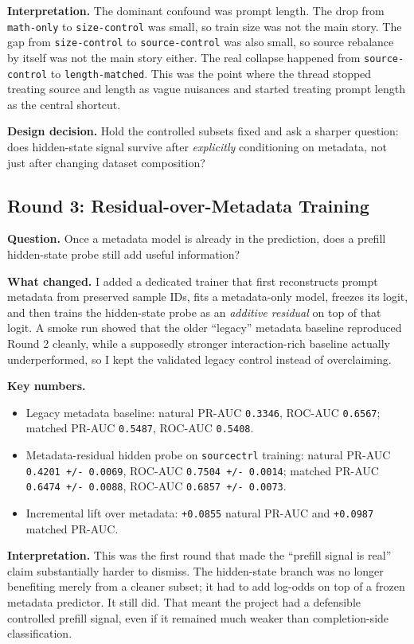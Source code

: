 \documentclass[11pt]{article}
\begin{document}
\textbf{Interpretation.} The dominant confound was prompt length. The drop from \texttt{math-only} to \texttt{size-control} was small, so train size was not the main story. The gap from \texttt{size-control} to \texttt{source-control} was also small, so source rebalance by itself was not the main story either. The real collapse happened from \texttt{source-control} to \texttt{length-matched}. This was the point where the thread stopped treating source and length as vague nuisances and started treating prompt length as the central shortcut.

\textbf{Design decision.} Hold the controlled subsets fixed and ask a sharper question: does hidden-state signal survive after \emph{explicitly} conditioning on metadata, not just after changing dataset composition?

\subsection*{Round 3: Residual-over-Metadata Training}
\textbf{Question.} Once a metadata model is already in the prediction, does a prefill hidden-state probe still add useful information?

\textbf{What changed.} I added a dedicated trainer that first reconstructs prompt metadata from preserved sample IDs, fits a metadata-only model, freezes its logit, and then trains the hidden-state probe as an \emph{additive residual} on top of that logit. A smoke run showed that the older ``legacy'' metadata baseline reproduced Round 2 cleanly, while a supposedly stronger interaction-rich baseline actually underperformed, so I kept the validated legacy control instead of overclaiming.

\textbf{Key numbers.}
\begin{itemize}
  \item Legacy metadata baseline:
    natural PR-AUC \texttt{0.3346}, ROC-AUC \texttt{0.6567};
    matched PR-AUC \texttt{0.5487}, ROC-AUC \texttt{0.5408}.
  \item Metadata-residual hidden probe on \texttt{sourcectrl} training:
    natural PR-AUC \texttt{0.4201 +/- 0.0069}, ROC-AUC \texttt{0.7504 +/- 0.0014};
    matched PR-AUC \texttt{0.6474 +/- 0.0088}, ROC-AUC \texttt{0.6857 +/- 0.0073}.
  \item Incremental lift over metadata:
    \texttt{+0.0855} natural PR-AUC and \texttt{+0.0987} matched PR-AUC.
\end{itemize}

\textbf{Interpretation.} This was the first round that made the ``prefill signal is real'' claim substantially harder to dismiss. The hidden-state branch was no longer benefiting merely from a cleaner subset; it had to add log-odds on top of a frozen metadata predictor. It still did. That meant the project had a defensible controlled prefill signal, even if it remained much weaker than completion-side classification.
\end{document}
